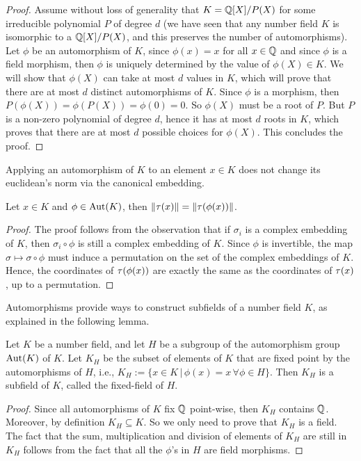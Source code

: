 \begin{proof}
Assume without loss of generality that $K = \mathbb{Q}[X]/P(X)$ for some irreducible polynomial $P$ of degree $d$ (we have seen that any number field $K$ is isomorphic to a $\mathbb{Q}[X]/P(X)$, and this preserves the number of automorphisms). Let $\phi$ be an automorphism of $K$, since $\phi(x) = x$ for all $x \in \mathbb{Q}$ and since $\phi$ is a field morphism, then $\phi$ is uniquely determined by the value of $\phi(X) \in K$. We will show that $\phi(X)$ can take at most $d$ values in $K$, which will prove that there are at most $d$ distinct automorphisms of $K$.
Since $\phi$ is a morphism, then $P(\phi(X)) = \phi(P(X)) = \phi(0) = 0$. So $\phi(X)$ must be a root of $P$. But $P$ is a non-zero polynomial of degree $d$, hence it has at most $d$ roots in $K$, which proves that there are at most $d$ possible choices for $\phi(X)$. This concludes the proof.
\end{proof}

Applying an automorphism of $K$ to an element $x \in K$ does not change its euclidean's norm via the canonical embedding.
\begin{lemma}
\label{lemma:automorphism-preserves-size}
Let $x \in K$ and $\phi \in \operatorname{Aut}(K)$, then $\|\tau(x)\| = \|\tau(\phi(x))\|$.
\end{lemma}
\begin{proof}
The proof follows from the observation that if $\sigma_i$ is a complex embedding of $K$, then $\sigma_i \circ \phi$ is still a complex embedding of $K$. Since $\phi$ is invertible, the map $\sigma \mapsto \sigma \circ \phi$ must induce a permutation on the set of the complex embeddings of $K$. Hence, the coordinates of $\tau(\phi(x))$ are exactly the same as the coordinates of $\tau(x)$, up to a permutation.
\end{proof}

Automorphisms provide ways to construct subfields of a number field $K$, as explained in the following lemma.
\begin{lemma}
Let $K$ be a number field, and let $H$ be a subgroup of the automorphism group $\operatorname{Aut}(K)$ of $K$. Let $K_H$ be the subset of elements of $K$ that are fixed point by the automorphisms of $H$, i.e., $K_H := \{ x \in K \,|\, \phi(x) = x \, \forall \phi \in H\}$. Then $K_H$ is a subfield of $K$, called the fixed-field of $H$.
\end{lemma}

\begin{proof}
Since all automorphisms of $K$ fix $\mathbb{Q}$ point-wise, then $K_H$ contains $\mathbb{Q}$. Moreover, by definition $K_H \subseteq K$. So we only need to prove that $K_H$ is a field. The fact that the sum, multiplication and division of elements of $K_H$ are still in $K_H$ follows from the fact that all the $\phi$'s in $H$ are field morphisms.
\end{proof}

